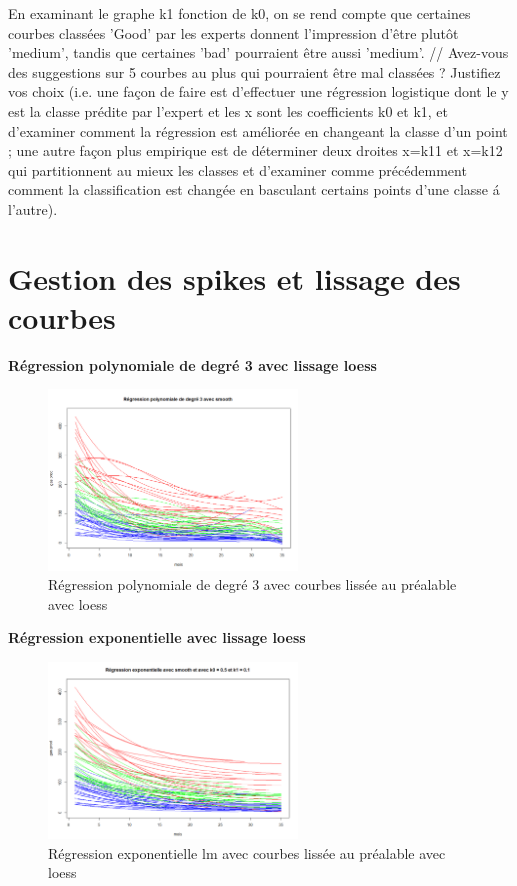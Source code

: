 \documentclass[12pt]{article}
\begin{document}
En examinant le graphe k1 fonction de k0, on se rend compte que certaines courbes
class\'ees 'Good' par les experts donnent l'impression d'\^etre plut\^ot 'medium', tandis que
certaines 'bad' pourraient \^etre aussi 'medium'. //
Avez-vous des suggestions sur 5 courbes au
plus qui pourraient \^etre mal class\'ees ? Justifiez vos choix (i.e. une fa\c con de faire est
d'effectuer une r\'egression logistique dont le y est la classe pr\'edite par l'expert et les x sont
les coefficients k0 et k1, et d'examiner comment la r\'egression est am\'elior\'ee en changeant la
classe d'un point ; une autre fa\c con plus empirique est de d\'eterminer deux droites x=k11 et
x=k12 qui partitionnent au mieux les classes et d'examiner comme pr\'ec\'edemment comment
la classification est chang\'ee en basculant certains points d'une classe \'a l'autre).


\newpage

\section{Gestion des spikes et lissage des courbes}

\textbf{R\'egression polynomiale de degr\'e 3 avec lissage loess}

\begin{figure}[H]
 \centering %
	\includegraphics[width=250px]{reg_pol3_smooth_loess}
  \caption{\label{fig:reg_pol3_smooth_loess} R\'egression polynomiale de degr\'e 3 avec courbes liss\'ee au pr\'ealable avec loess}
\end{figure}

\textbf{R\'egression exponentielle avec lissage loess}

\begin{figure}[H]
 \centering %
	\includegraphics[width=250px]{reg_exp_smooth_loess}
  \caption{\label{fig:reg_exp_smooth_loess} R\'egression exponentielle lm avec courbes liss\'ee au pr\'ealable avec loess}
\end{figure}
\end{document}
